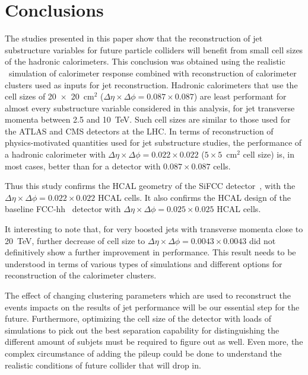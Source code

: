\section{Conclusions}
The studies presented in this paper show that the reconstruction of jet substructure 
variables for future particle colliders will benefit from small cell sizes of the hadronic calorimeters. 
This conclusion was obtained using the realistic \GEANTfour\ simulation of calorimeter response combined with reconstruction of 
calorimeter clusters used as inputs for jet reconstruction. 
Hadronic calorimeters that use the cell sizes of 20~$\times $~20~cm$^2$ ($\Delta \eta \times \Delta \phi = 0.087\times 0.087$) 
are least performant for almost every 
substructure variable considered in this analysis, for jet transverse momenta between 2.5 and 10~TeV. 
Such cell sizes are similar to 
those used for the ATLAS and CMS detectors at the LHC. 
In terms of reconstruction of physics-motivated quantities  
used for jet substructure studies, the  performance 
of a  hadronic calorimeter  with 
$\Delta \eta \times \Delta \phi = 0.022\times0.022$ ($5 \times 5$~$\mathrm{cm}^2$ cell size) is, in most cases,
better than for a detector with  $0.087\times 0.087$ cells.

Thus this study confirms the  HCAL geometry of the SiFCC detector~\cite{Chekanov:2016ppq},
with the $\Delta \eta \times \Delta \phi = 0.022\times0.022$ HCAL cells.
It also confirms the HCAL design of the baseline FCC-hh~\cite{fcc1,fcc2} detector with
$\Delta \eta \times \Delta \phi = 0.025\times0.025$ HCAL cells.

It interesting to note that,  for very boosted jets with transverse momenta close to 20~TeV, further decrease of cell size to $\Delta \eta \times \Delta \phi = 0.0043\times0.0043$ did not 
 definitively show a further improvement in performance. 
 This result needs to be understood in terms of various types of simulations and 
different options for reconstruction of the calorimeter clusters.

The effect of changing clustering parameters which are used to reconstruct the events impacts on the results of jet performance will be our essential step for the future. Furthermore, optimizing the cell size of the detector with loads of simulations to pick out the best separation capability for distinguishing the different amount of subjets must be required to figure out as well. Even more, the complex circumstance of adding the pileup could be done to understand the realistic conditions of future collider that will drop in.